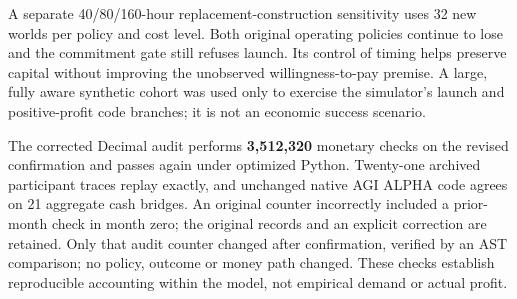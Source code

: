 A separate 40/80/160-hour replacement-construction sensitivity uses 32 new worlds
per policy and cost level. Both original operating policies continue to lose and
the commitment gate still refuses launch. Its control of timing helps preserve
capital without improving the unobserved willingness-to-pay premise. A large,
fully aware synthetic cohort was used only to exercise the simulator's launch
and positive-profit code branches; it is not an economic success scenario.

The corrected Decimal audit performs \textbf{3,512,320} monetary checks on the
revised confirmation and passes again under optimized Python. Twenty-one
archived participant traces replay exactly, and unchanged native AGI ALPHA code
agrees on 21 aggregate cash bridges. An original counter incorrectly included a
prior-month check in month zero; the original records and an explicit correction
are retained. Only that audit counter changed after confirmation, verified by an
AST comparison; no policy, outcome or money path changed. These checks establish
reproducible accounting within the model, not empirical demand or actual profit.

